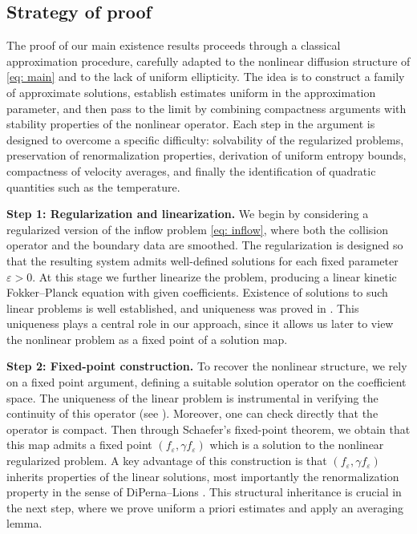 \documentclass[10pt, reqno]{amsart}
\theoremstyle{plain}
\theoremstyle{definition}
\theoremstyle{remark}
\numberwithin{equation}{section}
\newcommand{\ve}{\varepsilon}
\begin{document}
  
 
  
%
%
%
%
%
%
\subsection{Strategy of proof}\label{sec: strat}

The proof of our main existence results proceeds through a classical approximation procedure, carefully adapted to the nonlinear diffusion structure of \eqref{eq: main} and to the lack of uniform ellipticity. The idea is to construct a family of approximate solutions, establish estimates uniform in the approximation parameter, and then pass to the limit by combining compactness arguments with stability properties of the nonlinear operator. Each step in the argument is designed to overcome a specific difficulty: solvability of the regularized problems, preservation of renormalization properties, derivation of uniform entropy bounds, compactness of velocity averages, and finally the identification of quadratic quantities such as the temperature.


\medskip

\noindent
\textbf{Step 1: Regularization and linearization.}
We begin by considering a regularized version of the inflow problem \eqref{eq: inflow}, where both the collision operator and the boundary data are smoothed. The regularization is designed so that the resulting system admits well-defined solutions for each fixed parameter $\ve>0$. At this stage we further linearize the problem, producing a linear kinetic Fokker--Planck equation with given coefficients. Existence of solutions to such linear problems is well established, and uniqueness was proved in \cite[Theorem 1.1]{Zhu24}. This uniqueness plays a central role in our approach, since it allows us later to view the nonlinear problem as a fixed point of a solution map.

\medskip

\noindent
\textbf{Step 2: Fixed-point construction.}
To recover the nonlinear structure, we rely on a fixed point argument, defining a suitable solution operator on the coefficient space. The uniqueness of the linear problem is instrumental in verifying the continuity of this operator (see \cite{Abdallah1994}). Moreover, one can check directly that the operator is compact. Then through Schaefer's fixed-point theorem, we obtain that this map admits a fixed point $(f_\ve, \gamma f_\ve)$ which is a solution to the nonlinear regularized problem. A key advantage of this construction is that $(f_\ve, \gamma f_\ve)$ inherits properties of the linear solutions, most importantly the renormalization property in the sense of DiPerna--Lions \cite{DipernaLionsODE1989}. This structural inheritance is crucial in the next step, where we prove uniform a priori estimates and apply an averaging lemma.
\end{document}
